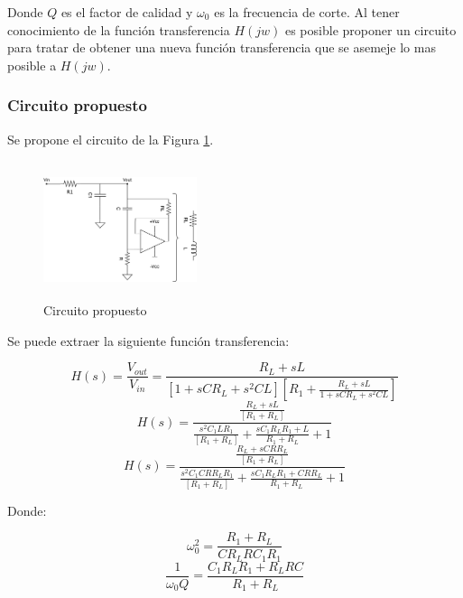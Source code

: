 Donde $Q$ es el factor de calidad y $\omega_0$ es la frecuencia de corte.      
Al tener conocimiento de la función transferencia $H(jw)$ es posible proponer un circuito para tratar de obtener una nueva función transferencia que se asemeje lo mas posible a $H(jw)$. 

\subsubsection{Circuito propuesto}
Se propone el circuito de la Figura \ref{fig:ej2_BP_propuesto}. 

\begin{figure}[!]                                                       
    \centering\includegraphics[width=0.4\textwidth, height=4cm]{../Ex2/Resources/ej2_bp_gyrator.png}
    \caption{Circuito propuesto}
    \label{fig:ej2_BP_propuesto}
    \end{figure}

Se puede extraer la siguiente función transferencia:

\begin{displaymath} H(s)= \frac{V_{out}}{V_{in}} = \frac{R_L + sL}{[1+sC R_L + s^2 C L] [R_1 + \frac{R_L + sL}{1 + sCR_L + s^2 C L}]} \end{displaymath}  
\begin{displaymath} H(s)= \frac{\frac{R_L + sL}{[R_1 + R_L]}}{\frac{s^2 C_1 L R_1}{[R_1 + R_L]} + \frac{s C_1 R_L R_1 + L}{R_1 + R_L} +1} \end{displaymath}
\begin{displaymath} H(s)= \frac{\frac{R_L + sCR R_L}{[R_1 + R_L]}}{\frac{s^2 C_1 CR R_L R_1}{[R_1 + R_L]} + \frac{s C_1 R_L R_1 + CR R_L}{R_1 + R_L} +1} \end{displaymath}

Donde:

\begin{displaymath} \omega_0^2= \frac{R_1 + R_L}{CR_LRC_1 R_1} \end{displaymath}  
\begin{displaymath} \frac{1}{\omega_0 Q}= \frac{C_1 R_L R_1 + R_L R C}{R_1 + R_L} \end{displaymath}  





